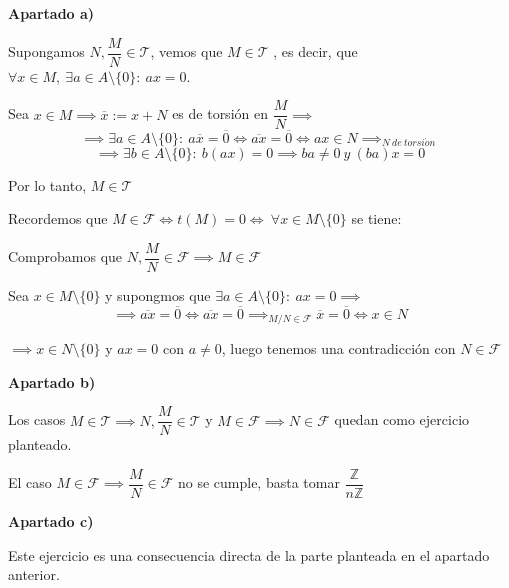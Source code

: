 \documentclass[openany]{book}
\begin{document}
\begin{exercise}
    $ $
    
    \begin{flushright}
        \textbf{Apartado a)}
    \end{flushright}
    
    Supongamos $ N,\dfrac{M}{N} \in \mathcal{T}$, vemos que $ M \in \mathcal{T} $ , es decir, que $ \forall x \in M, \ \exists a \in A \setminus \{0\}:\ ax = 0$.

    Sea $ x \in M \implies \overline{x}:= x +N$ es de torsión en $ \dfrac{M}{N} \implies $
    $$ \implies \exists a \in A \setminus \{0\}:\ a\overline{x} = \overline{0} \iff \overline{ax} = \overline{0} \iff ax \in N \implies_{N\ de\ torsi\acute on} $$
    $$ \implies \exists b \in A \setminus \{0\}:\ b(ax) = 0 \implies ba \ne 0\ y\ (ba)x = 0$$

    Por lo tanto, $ M \in \mathcal{T}$

    Recordemos que  $ M \in \mathcal{F} \iff t(M) = 0 \iff \ \forall x \in M \setminus \{0\}$ se tiene:

    Comprobamos que $ N,\dfrac{M}{N} \in \mathcal{F} \implies M \in \mathcal{F}$

    Sea $ x \in M \setminus \{0\}$ y supongmos que $ \exists a \in A \setminus \{0\}:\ ax = 0 \implies$
    $$ \implies \overline{ax} = \overline{0} \iff \overline{ax} = \overline{0} \implies_{M/N \in \mathcal{F}} \overline{x} = \overline{0} \iff x \in N $$

    $ \implies x \in N \setminus \{0\}$ y $ ax =0$ con $ a\ne 0$, luego tenemos una contradicción con $ N \in \mathcal{F}$

    \begin{flushright}
        \textbf{Apartado b)}
    \end{flushright}
    
    Los casos $ M \in \mathcal{T} \implies N, \dfrac{M}{N} \in \mathcal{T}$ y $ M \in \mathcal{F} \implies N \in \mathcal{F}$ quedan como ejercicio planteado.

    El caso $ M \in \mathcal{F} \implies \dfrac{M}{N} \in \mathcal{F}$ no se cumple, basta tomar $ \dfrac{\mathbb{Z}}{n\mathbb{Z}}$

    \begin{flushright}
        \textbf{Apartado c)}
    \end{flushright}

    Este ejercicio es una consecuencia directa de la parte planteada en el apartado anterior.


\end{exercise}
\end{document}
